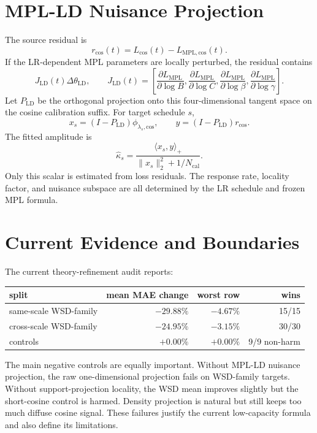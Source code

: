 \documentclass{article}
\newcommand{\MPL}{\mathrm{MPL}}
\newcommand{\LD}{\mathrm{LD}}
\newcommand{\cosine}{\mathrm{cos}}
\begin{document}
\section{MPL-LD Nuisance Projection}
The source residual is
\begin{equation}
  r_{\cosine}(t)=L_{\cosine}(t)-L_{\MPL,\cosine}(t).
\end{equation}
If the LR-dependent MPL parameters are locally perturbed, the residual contains
\begin{equation}
  J_{\LD}(t)\Delta\theta_{\LD},
  \qquad
  J_{\LD}(t)=
  \left[
  \frac{\partial L_{\MPL}}{\partial\log B},
  \frac{\partial L_{\MPL}}{\partial\log C},
  \frac{\partial L_{\MPL}}{\partial\log\beta},
  \frac{\partial L_{\MPL}}{\partial\log\gamma}
  \right].
\end{equation}
Let \(P_{\LD}\) be the orthogonal projection onto this four-dimensional tangent space on the
cosine calibration suffix.  For target schedule \(s\),
\begin{equation}
  x_s=(I-P_{\LD})\phi_{\lambda_s,\cosine},
  \qquad
  y=(I-P_{\LD})r_{\cosine}.
\end{equation}
The fitted amplitude is
\begin{equation}\label{eq:kappa_supp}
  \widehat\kappa_s
  =
  \frac{\langle x_s,y\rangle_+}
       {\|x_s\|_2^2+1/N_{\mathrm{cal}}}.
\end{equation}
Only this scalar is estimated from loss residuals.  The response rate, locality factor, and
nuisance subspace are all determined by the LR schedule and frozen MPL formula.

\section{Current Evidence and Boundaries}
The current theory-refinement audit reports:
\begin{center}
\begin{tabular}{lrrr}
\toprule
split & mean MAE change & worst row & wins \\
\midrule
same-scale WSD-family & \(-29.88\%\) & \(-4.67\%\) & 15/15 \\
cross-scale WSD-family & \(-24.95\%\) & \(-3.15\%\) & 30/30 \\
controls & \(+0.00\%\) & \(+0.00\%\) & 9/9 non-harm \\
\bottomrule
\end{tabular}
\end{center}
The main negative controls are equally important.  Without MPL-LD nuisance projection, the raw
one-dimensional projection fails on WSD-family targets.  Without support-projection locality,
the WSD mean improves slightly but the short-cosine control is harmed.  Density projection is
natural but still keeps too much diffuse cosine signal.  These failures justify the current
low-capacity formula and also define its limitations.
\end{document}
